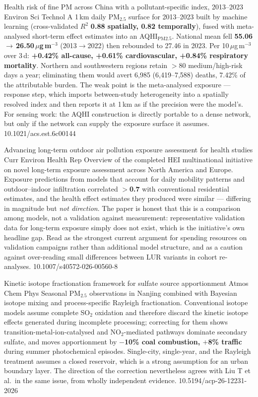 \documentclass[10pt]{article}
\begin{document}

{Health risk of fine PM across China with a pollutant-specific index, 2013--2023}
{Environ Sci Technol}
{A 1\,km daily PM$_{2.5}$ surface for 2013--2023 built by machine learning
(cross-validated $R^2$ \textbf{0.88 spatially, 0.82 temporally}), fused with
meta-analysed short-term effect estimates into an AQHI$_{\mathrm{PM2.5}}$. National mean
fell \textbf{55.06\,$\to$\,26.50\,$\mu$g\,m$^{-3}$} (2013$\to$2022) then rebounded to
27.46 in 2023. Per 10\,$\mu$g\,m$^{-3}$ over 3\,d: \textbf{+0.42\% all-cause, +0.61\%
cardiovascular, +0.84\% respiratory mortality}. Northern and southwestern regions retain
$>$80 medium/high-risk days a year; eliminating them would avert 6{,}985 (6{,}419--7{,}588)
deaths, 7.42\% of the attributable burden. The weak point is the meta-analysed exposure
--- response step, which imports between-study heterogeneity into a spatially resolved
index and then reports it at 1\,km as if the precision were the model's. For sensing
work: the AQHI construction is directly portable to a dense network, but only if the
network can supply the exposure surface it assumes.}
{10.1021/acs.est.6c00144}

{Advancing long-term outdoor air pollution exposure assessment for health studies}
{Curr Environ Health Rep}
{Overview of the completed HEI multinational initiative on novel long-term exposure
assessment across North America and Europe. Exposure predictions from models that account
for daily mobility patterns and outdoor--indoor infiltration correlated
\textbf{$>$0.7} with conventional residential estimates, and the health effect estimates
they produced were similar --- differing in magnitude but \emph{not direction}. The paper
is honest that this is a comparison among models, not a validation against measurement:
representative validation data for long-term exposure simply does not exist, which is the
initiative's own headline gap. Read as the strongest current argument for spending
resources on validation campaigns rather than additional model structure, and as a caution
against over-reading small differences between LUR variants in cohort re-analyses.}
{10.1007/s40572-026-00560-8}

{Kinetic isotope fractionation framework for sulfate source apportionment}
{Atmos Chem Phys}
{Seasonal PM$_{2.5}$ observations in Nanjing combined with Bayesian isotope mixing and
process-specific Rayleigh fractionation. Conventional isotope models assume complete
SO$_2$ oxidation and therefore discard the kinetic isotope effects generated during
incomplete processing; correcting for them shows transition-metal-ion-catalysed and
NO$_2$-mediated pathways dominate secondary sulfate, and moves apportionment by
\textbf{$-$10\% coal combustion, $+$8\% traffic} during summer photochemical episodes.
Single-city, single-year, and the Rayleigh treatment assumes a closed reservoir, which is
a strong assumption for an urban boundary layer. The direction of the correction
nevertheless agrees with Liu T et al.\ in the same issue, from wholly independent
evidence.}
{10.5194/acp-26-12231-2026}
\end{document}

